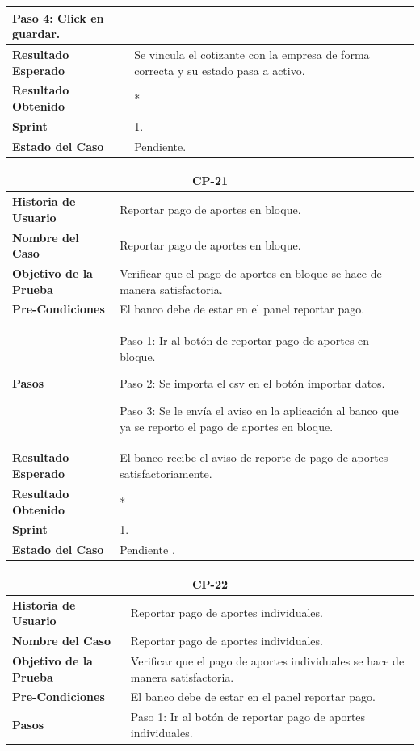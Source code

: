 \documentclass[12pt,a4paper]{article}
\begin{document}
\begin{center}
\begin{tabular}{|m{5cm}|m{9cm}|}
Paso 4: Click en guardar.
\\
\hline
\textbf{Resultado Esperado} & Se vincula el cotizante con la empresa de forma correcta y su estado pasa a activo. \\
\hline
\textbf{Resultado Obtenido} & * \\
\hline
\textbf{Sprint} & 1. \\
\hline
\textbf{Estado del Caso} & Pendiente. \\
\hline
\end{tabular}
\vspace{5mm}

\begin{tabular}{|m{5cm}|m{9cm}|}
\hline
\multicolumn{2}{|c|}{\textbf{CP-21}} \\
\hline
\textbf{Historia de Usuario} & Reportar pago de aportes en bloque.\\
\hline
\textbf{Nombre del Caso} & Reportar pago de aportes en bloque.\\
\hline
\textbf{Objetivo de la Prueba} & Verificar que el pago de aportes en bloque se hace de manera satisfactoria.\\
\hline
\textbf{Pre-Condiciones} & El banco debe de estar en el panel reportar pago.\\
\hline
\textbf{Pasos} & Paso 1: Ir al botón de reportar pago de aportes en bloque.

Paso 2: Se importa el csv en el botón importar datos.

Paso 3: Se le envía el aviso en la aplicación al banco que ya se reporto el pago de aportes en bloque.\\
\hline
\textbf{Resultado Esperado} & El banco recibe el aviso de reporte de pago de aportes satisfactoriamente.\\
\hline
\textbf{Resultado Obtenido} & *\\
\hline
\textbf{Sprint} & 1. \\
\hline
\textbf{Estado del Caso} & Pendiente .\\
\hline
\end{tabular}
\vspace{5mm}


\begin{tabular}{|m{5cm}|m{9cm}|}
\hline
\multicolumn{2}{|c|}{\textbf{CP-22}} \\
\hline
\textbf{Historia de Usuario} & Reportar pago de aportes individuales.\\
\hline
\textbf{Nombre del Caso} & Reportar pago de aportes individuales.\\
\hline
\textbf{Objetivo de la Prueba} & Verificar que el pago de aportes individuales se hace de manera satisfactoria.\\
\hline
\textbf{Pre-Condiciones} & El banco debe de estar en el panel reportar pago.\\
\hline
\textbf{Pasos} & Paso 1: Ir al botón de reportar pago de aportes individuales.


\end{tabular}
\end{center}
\end{document}
